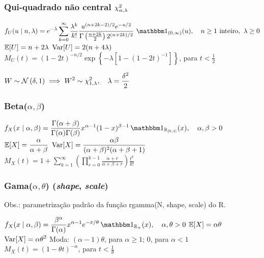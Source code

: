 \subsubsection{Qui-quadrado não central $\chi^2_{n,\lambda}$}
\begin{outline}
	\1 \(\displaystyle f_U(u\mid n,\lambda) = e^{-\lambda}\sum_{k=0}^{\infty}\frac{\lambda^k}{k!}\frac{u^{(n+2k-2)/2}e^{-u/2}}{\Gamma\left(\frac{n+2k}{2}\right)2^{(n+2k)/2}}\,\ind_{(0,\infty)}(u), \quad n\geq 1 \text{ inteiro}, \ \lambda\geq 0\)
	\1 \( \operatorname{\mathbb{E}}[U] = n + 2\lambda \)
	\1 \( \operatorname{Var}[U] = 2(n + 4\lambda) \)
	\1 \(\displaystyle M_U(t) = (1-2t)^{-n/2}\exp\left\{-\lambda\left[1-(1-2t)^{-1}\right]\right\} \), para $t<\frac{1}{2}$
\end{outline}

\begin{theorem}
	\leavevmode
	\begin{outline}[enumerate]
		\1 \( \displaystyle W \sim \normdist{\delta, 1} \implies W^2 \sim \chidist{1, \lambda}, \quad \lambda=\frac{\delta^2}{2} \)
	\end{outline}
	
\end{theorem}

\subsubsection{Beta($\alpha, \beta$)}
\begin{outline}
	\1 \(\displaystyle f_X(x \mid \alpha, \beta) = \frac{\Gamma(\alpha+\beta)}{\Gamma(\alpha)\Gamma(\beta)} x^{\alpha-1}(1-x)^{\beta-1}\ind_{\Re_{[0,1]}}(x), \quad \alpha,\beta>0 \)
	\1 \(\displaystyle \operatorname{\mathbb{E}}[X] = \frac{\alpha}{\alpha+\beta} \)
	\1 \(\displaystyle \operatorname{Var}[X] = \frac{\alpha\beta}{(\alpha+\beta)^2(\alpha+\beta+1)} \)
	\1 \(\displaystyle M_X(t) = 1 + \sum_{k=1}^{\infty} \left( \prod_{r=0}^{k-1} \frac{\alpha+r}{\alpha+\beta+r} \right)\frac{t^k}{k!} \)
\end{outline}

\subsubsection{Gama($\alpha, \theta$) (\textit{shape}, \textit{scale})}
Obs.: parametrização padrão da função rgamma(N, shape, scale) do R.
\begin{outline}
	\1 \(\displaystyle f_X(x \mid \alpha, \beta) = \frac{\beta^\alpha}{\Gamma(\alpha)} x^{\alpha-1}e^{-x/\theta}\ind_{\Re_+}(x), \quad \alpha,\theta>0 \)
	\1 \(\displaystyle \operatorname{\mathbb{E}}[X] = \alpha\theta \)
	\1 \(\displaystyle \operatorname{Var}[X] = \alpha\theta^2 \)
	\1 Moda: $(\alpha-1)\theta$, para $\alpha\geq1$; $0$, para $\alpha<1$
	\1 \(\displaystyle M_X(t) = (1-\theta t)^{-\alpha} \), para  $t<\frac{1}{\theta}$
\end{outline}

